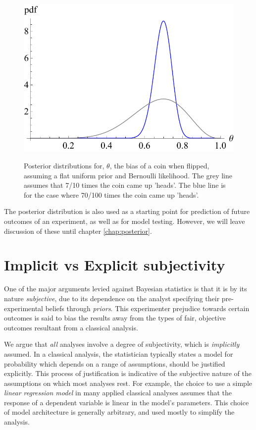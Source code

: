 \documentclass[11pt,fullpage]{book}
\begin{document}
\begin{figure}
\centering
\scalebox{0.6} 
{\includegraphics{Intro_posteriorPeaked.pdf}}
\caption{Posterior distributions for, $\theta$, the bias of a coin when flipped, assuming a flat uniform prior and Bernoulli likelihood. The grey line assumes that 7/10 times the coin came up 'heads'. The blue line is for the case where 70/100 times the coin came up 'heads'.}\label{fig:Intro_posteriorPeaked}
\end{figure}

The posterior distribution is also used as a starting point for prediction of future outcomes of an experiment, as well as for model testing. However, we will leave discussion of these until chapter \ref{chap:posterior}.

\section{Implicit vs Explicit subjectivity}\label{sec:Intro_implicitExplicitSubjectivity}
One of the major arguments levied against Bayesian statistics is that it is by its nature \textit{subjective}, due to its dependence on the analyst specifying their pre-experimental beliefs through \textit{priors}. This experimenter prejudice towards certain outcomes is said to bias the results away from the types of fair, objective outcomes resultant from a classical analysis. 

We argue that \textit{all} analyses involve a degree of subjectivity, which is \textit{implicitly} assumed. In a classical analysis, the statistician typically states a model for probability which depends on a range of assumptions,  should be justified explicitly. This process of justification is indicative of the subjective nature of the assumptions on which most analyses rest. For example, the choice to use a simple \textit{linear regression model} in many applied classical analyses assumes that the response of a dependent variable is linear in the model's parameters. This choice of model architecture is generally arbitrary, and used mostly to simplify the analysis. 
\end{document}
